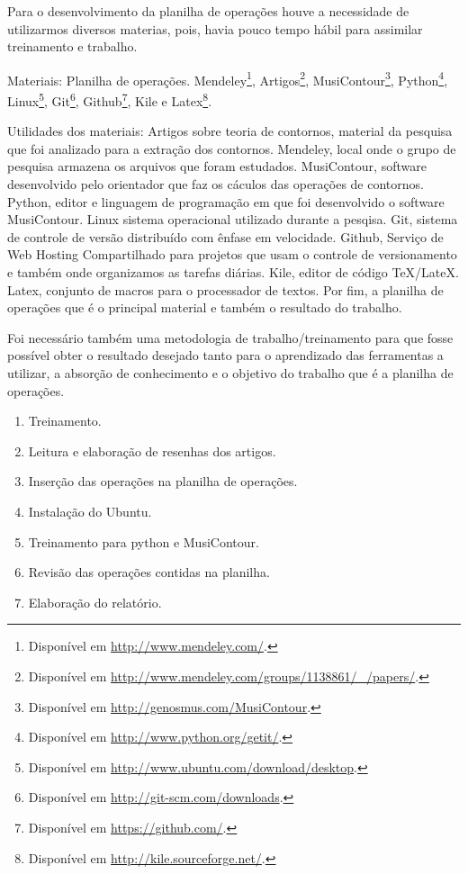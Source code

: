 \documentclass[11pt]{article}
\begin{document}
\label{sec:materiais}

Para o desenvolvimento da planilha de operações houve a necessidade de 
utilizarmos diversos materias, pois, havia pouco tempo hábil para assimilar
treinamento e trabalho.

Materiais:
Planilha de operações.
Mendeley\footnote{Disponível em
  \url{http://www.mendeley.com/}.}, Artigos\footnote{Disponível em
  \url{http://www.mendeley.com/groups/1138861/_/papers/}.},
  MusiContour\footnote{Disponível em \url{http://genosmus.com/MusiContour}.},
  Python\footnote{Disponível em  \url{http://www.python.org/getit/}.},
  Linux\footnote{Disponível em
  \url{http://www.ubuntu.com/download/desktop}.},
  Git\footnote{Disponível em
  \url{http://git-scm.com/downloads}.}, Github\footnote{Disponível em
  \url{https://github.com/}.}, Kile e Latex\footnote{Disponível em
  \url{http://kile.sourceforge.net/}.}.
  
Utilidades dos materiais: Artigos sobre teoria de contornos, material da pesquisa
que foi analizado para a extração dos contornos. Mendeley, local onde o grupo de pesquisa
armazena os arquivos que foram estudados. MusiContour, software desenvolvido pelo orientador
que faz os cáculos das operações de contornos. Python, editor e linguagem de programação em 
que foi desenvolvido o software MusiContour. Linux sistema operacional utilizado durante a pesqisa.
Git, sistema de controle de versão distribuído com ênfase em velocidade. Github, Serviço de Web 
Hosting Compartilhado para projetos que usam o controle de versionamento e também onde organizamos
as tarefas diárias. Kile, editor de código TeX/LateX. Latex, conjunto de macros para o processador de 
textos. Por fim, a planilha de operações que é o principal material e também o resultado do trabalho.


Foi necessário também uma metodologia de trabalho/treinamento para que fosse possível obter
o resultado desejado tanto para o aprendizado das ferramentas a utilizar, a absorção de conhecimento
e o objetivo do trabalho que é a planilha de operações.

\begin{enumerate} 
\item Treinamento.
\item Leitura e elaboração de resenhas dos artigos.
\item Inserção das operações na planilha de operações.
\item Instalação do Ubuntu.
\item Treinamento para python e MusiContour.
\item Revisão das operações contidas na planilha.
\item Elaboração do relatório.
\end{enumerate}
\end{document}
